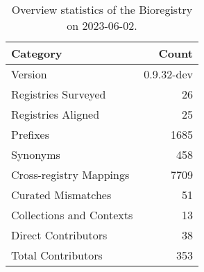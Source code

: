 \begin{table}
\caption{Overview statistics of the Bioregistry on 2023-06-02.}
\label{tab:bioregistry-summary}
\begin{tabular}{lr}
\toprule
Category & Count \\
\midrule
Version & 0.9.32-dev \\
Registries Surveyed & 26 \\
Registries Aligned & 25 \\
Prefixes & 1685 \\
Synonyms & 458 \\
Cross-registry Mappings & 7709 \\
Curated Mismatches & 51 \\
Collections and Contexts & 13 \\
Direct Contributors & 38 \\
Total Contributors & 353 \\
\bottomrule
\end{tabular}
\end{table}
